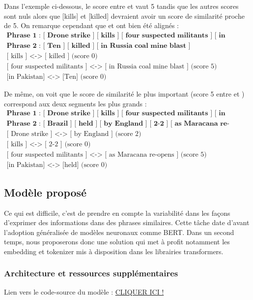 \documentclass[a4paper, twoside, 11pt]{article}
\begin{document}
Dans l'exemple ci-dessous, le score entre  \fg{} et   \fg{} vaut 5 tandis que les autres scores sont nuls alors que [kills] et [killed] devraient avoir un score de similarité proche de 5. On remarque cependant que \og [ kills ] \fg{} et \og [ killed ] \fg{} ont bien été alignés :
\begin{eqnarray*}
\textbf{Phrase 1 : [ Drone strike ] [ kills ] [ four suspected militants ] [ in Pakistan ]}\\
\textbf{Phrase 2 : [ Ten ] [ killed ] [ in Russia coal mine blast ]}\\
\textrm{[ kills ] <-> [ killed ] (score 0)}\\
\textrm{[ four suspected militants ] <-> [ in Russia coal mine blast ] (score 5)}\\
\textrm{[in Pakistan] <-> [Ten] (score 0)}
\end{eqnarray*}


De même, on voit que le score de similarité le plus important (score 5 entre  \fg{} et \fg{}) correspond aux deux segments les plus grands :
\begin{eqnarray*}
\textbf{Phrase 1 : [ Drone strike ] [ kills ] [ four suspected militants ] [ in Pakistan ]}\\
\textbf{Phrase 2 : [ Brazil ] [ held ] [ by England ] [ 2-2 ] [ as Maracana re-opens ]}\\
\textrm{[ Drone strike ] <-> [ by England ] (score 2)}\\
\textrm{[ kills ] <-> [ 2-2 ] (score 0)}\\
\textrm{[ four suspected militants ] <-> [ as Maracana re-opens ] (score 5)}\\
\textrm{[in Pakistan] <-> [held] (score 0)}
\end{eqnarray*}

    \subsection{Modèle proposé}
     Ce qui est difficile, c’est de prendre en compte la variabilité dans les façons d’exprimer des informations dans des phrases similaires. Cette tâche date d’avant l’adoption généralisée de modèles neuronaux comme BERT. Dans un second temps, nous proposerons donc une solution qui met à profit notamment les embedding et tokenizer mis à disposition dans les librairies transformers.

 \subsubsection{Architecture et ressources supplémentaires}
 Lien vers le code-source du modèle : \href{https://github.com/timfronteau/Semantic_chunk_identification}{CLIQUER ICI !}
\end{document}
